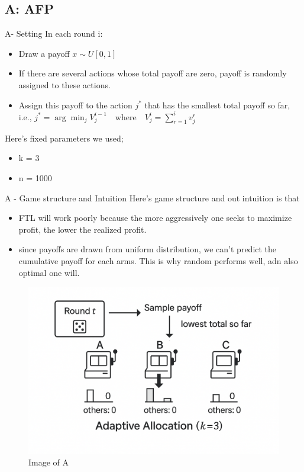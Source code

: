 \documentclass{beamer}
\begin{document}
\subsection{A: AFP}

\begin{frame}{A- Setting}
    In each round i:
    \begin{itemize}
        \item Draw a payoff $x \sim U[0,1]$
        \item If there are several actions whose total payoff are zero, payoff is randomly assigned to these actions.
        \item Assign this payoff to the action $j^*$ that has the smallest total payoff so far,\\
        i.e., $j^* = \arg\min_j V^{i-1}_{j} \quad \text{where} \quad V^{i}_{j} = \sum_{r=1}^{i} v^{r}_{j}$
    \end{itemize}
    \vspace{1em}
    Here's fixed parameters we used;
    \begin{itemize}
        \item k = 3
        \item n = 1000
    \end{itemize}
\end{frame}

\begin{frame}{A - Game structure and Intuition}
    Here's game structure and out intuition is that 
    \begin{itemize}
        \item FTL will work poorly because the more aggressively one seeks to maximize profit, the lower the realized profit.
        \item since payoffs are drawn from uniform distribution, we can't predict the cumulative payoff for each arms. This is why random performs well, adn also optimal one will.
    \end{itemize}
    \begin{figure}
        \centering
        \includegraphics[width=0.3\linewidth]{332Project2//figures/Image_A.png}
        \caption{Image of A}
        \label{fig:placeholder}
    \end{figure}
\end{frame}
\end{document}
